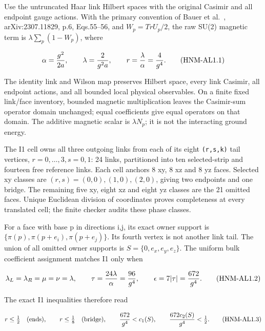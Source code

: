 Use the untruncated Haar link Hilbert spaces with the original Casimir and all endpoint gauge actions. With the primary convention of Bauer et al.~\citep{bauer2023basis}, arXiv:2307.11829, p.6, Eqs.55--56, and \(W_p=Tr U_p/2\), the raw SU(2) magnetic term is \(\lambda \sum_p(1-W_p)\), where

\begin{equation}
\alpha={g^2\over2a},\qquad\lambda={2\over g^2a},\qquad r={\lambda\over\alpha}={4\over g^4}.
\tag{HNM-AL1.1}
\label{r29:al1:eq1}
\end{equation}

The identity link and Wilson map preserves Hilbert space, every link Casimir, all endpoint actions, and all bounded local physical observables. On a finite fixed link/face inventory, bounded magnetic multiplication leaves the Casimir-sum operator domain unchanged; equal coefficients give equal operators on that domain. The additive magnetic scalar is \(\lambda N_p\); it is not the interacting ground energy.

The I1 cell owns all three outgoing links from each of its eight \texttt{(r,s,k)} tail vertices, \(r=0,\ldots,3,s=0,1\): 24 links, partitioned into ten selected-strip and fourteen free reference links. Each cell anchors 8 xy, 8 xz and 8 yz faces. Selected xy classes are \((r,s)=(0,0),(1,0),(2,0)\), giving two endpoints and one bridge. The remaining five xy, eight xz and eight yz classes are the 21 omitted faces. Unique Euclidean division of coordinates proves completeness at every translated cell; the finite checker audits these phase classes.

For a face with base p in directions i,j, its exact owner support is \(\{\pi(p),\pi(p+e_i),\pi(p+e_j)\}\). Its fourth vertex is not another link tail. The union of all omitted owner supports is \(S=\{0,e_x,e_y,e_z\}\). The uniform bulk coefficient assignment matches I1 only when

\begin{equation}
\lambda_L=\lambda_R=\mu=\nu=\lambda,\qquad
\tau={24\lambda\over\alpha}={96\over g^4},\qquad
\epsilon=7|\tau|={672\over g^4}.
\tag{HNM-AL1.2}
\label{r29:al1:eq2}
\end{equation}

The exact I1 inequalities therefore read

\begin{equation}
r\le\tfrac12\quad\hbox{(ends)},\qquad r\le\tfrac18\quad\hbox{(bridge)},
\qquad {672\over g^4}<c_1(S),\qquad {672c_2(S)\over g^4}<\tfrac12.
\tag{HNM-AL1.3}
\label{r29:al1:eq3}
\end{equation}

